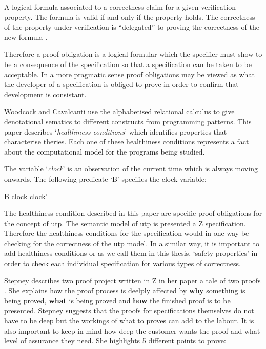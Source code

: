 \begin{defin}
A logical formula associated to a correctness claim for a given verification property. The formula is valid if and only if the property holds. The correctness of the property under verification is “delegated” to proving the correctness of the new formula \cite{handbookofembed}.
\end{defin}

Therefore a proof obligation is a logical formular which the specifier must show to be a consequence of the specification so that a specification can be taken to be acceptable. In a more pragmatic sense proof obligations may be viewed as what the developer of a specification is obliged to prove in order to confirm that development is consistant.

Woodcock and Cavalcanti \cite{woodcock2004tutorial} use the alphabetised relational calculus to give denotational sematics to different constructs from programming patterns. This paper describes `\emph{healthiness conditions}' which identifies properties that characterise theries. Each one of these healthiness conditions represents a fact about the computational model for the programs being studied.

\begin{exam}
The variable `\emph{clock}' is an observation of the current time which is always moving onwards. The following predicate `B' specifies the clock variable:

\begin{zed}
B  clock \leq clock'
\end{zed}
\end{exam}

The healthiness condition described in this paper are specific proof obligations for the concept of \gls{utp}. The semantic model of \gls{utp} is presented a Z specification. Therefore the healthiness conditions for the specification would in one way be checking for the correctness of the \gls{utp} model. In a similar way, it is important to add healthiness conditions or as we call them in this thesis, `safety properties' in order to check each individual specification for various types of correctness.

Stepney describes two proof project written in Z in her paper a tale of two proofs \cite{stepney1998tale}. She explains how the proof process is deelply affected by \textbf{why} something is being proved, \textbf{what} is being proved and \textbf{how} the finished proof is to be presented. Stepney suggests that the proofs for specifications themselves do not have to be deep but the workings of what to proves can add to the labour. It is also important to keep in mind how deep the customer wants the proof and what level of assurance they need. She highlights 5 different points to prove:

